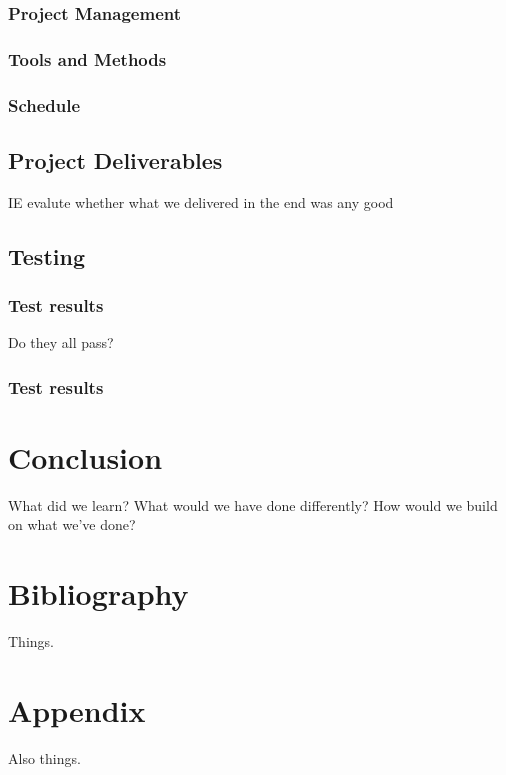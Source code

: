 \documentclass[a4paper]{article}
\begin{document}
\subsubsection{Project Management}

\subsubsection{Tools and Methods}

\subsubsection{Schedule}

\subsection{Project Deliverables}%
 IE evalute whether what we delivered in the end was any good

\subsection{Testing}%

\subsubsection{Test results}
Do they all pass? 

\subsubsection{Test results}

\section{Conclusion}

What did we learn? What would we have done differently?
How would we build on what we've done?

\section{Bibliography}

Things.

\section{Appendix}

Also things.
\end{document}
